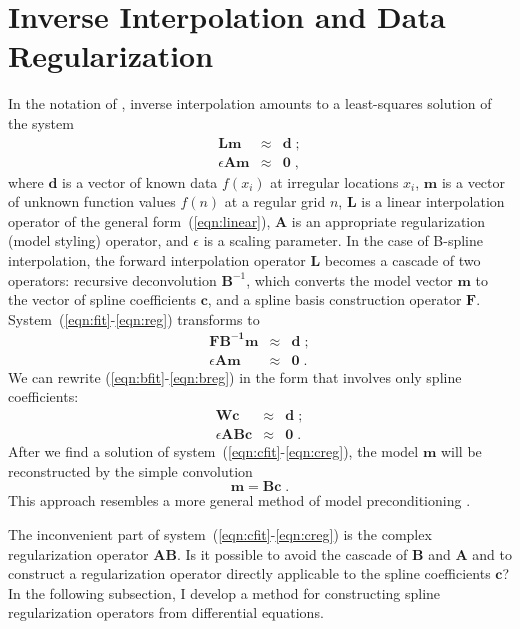 \section{Inverse Interpolation and Data Regularization}

In the notation of \cite{gee}, inverse interpolation amounts to a
least-squares solution of the system
\begin{eqnarray}
  \label{eqn:fit}
  \mathbf{L m} & \approx & \mathbf{d}\;; \\
  \label{eqn:reg}
  \epsilon \mathbf{A m} & \approx & \mathbf{0}\;, 
\end{eqnarray}
where $\mathbf{d}$ is a vector of known data $f(x_i)$ at irregular
locations $x_i$, $\mathbf{m}$ is a vector of unknown function values
$f(n)$ at a regular grid $n$, $\mathbf{L}$ is a linear interpolation
operator of the general form~(\ref{eqn:linear}), $\mathbf{A}$ is an
appropriate regularization (model styling) operator, and $\epsilon$ is
a scaling parameter. In the case of B-spline interpolation, the
forward interpolation operator $\mathbf{L}$ becomes a cascade of two
operators: recursive deconvolution $\mathbf{B}^{-1}$, which converts the
model vector $\mathbf{m}$ to the vector of spline coefficients
$\mathbf{c}$, and a spline basis construction operator $\mathbf{F}$.
System~(\ref{eqn:fit}-\ref{eqn:reg}) transforms to
\begin{eqnarray}
  \label{eqn:bfit}
  \mathbf{F B^{-1} m} & \approx & \mathbf{d}\;; \\
  \label{eqn:breg}
  \epsilon \mathbf{A m} & \approx & \mathbf{0}\;. 
\end{eqnarray}
We can rewrite (\ref{eqn:bfit}-\ref{eqn:breg}) in the form that
involves only spline coefficients:
\begin{eqnarray}
  \label{eqn:cfit}
  \mathbf{W c} & \approx & \mathbf{d}\;; \\
  \label{eqn:creg}
  \epsilon \mathbf{A B c} & \approx & \mathbf{0}\;. 
\end{eqnarray}
After we find a solution of system~(\ref{eqn:cfit}-\ref{eqn:creg}),
the model $\mathbf{m}$ will be reconstructed by the simple convolution
\begin{equation}
  \label{eqn:post}
  \mathbf{m = B c}\;.
\end{equation}
This approach resembles a more general method of model preconditioning
\cite[]{Fomel.sep.94.sergey1}.
\par
The inconvenient part of system~(\ref{eqn:cfit}-\ref{eqn:creg}) is the
complex regularization operator $\mathbf{A B}$. Is it possible to avoid
the cascade of $\mathbf{B}$ and $\mathbf{A}$ and to construct a
regularization operator directly applicable to the spline coefficients
$\mathbf{c}$? In the following subsection, I develop a method for
constructing spline regularization operators from differential
equations.

